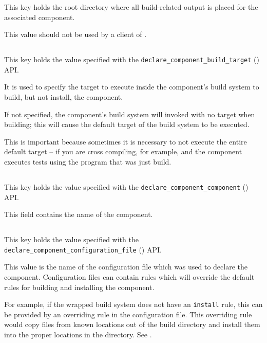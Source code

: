 This key holds the root directory where all build-related output is
placed for the associated component.

This value should not be used by a client of \lmsbw.

\subsection{}

This key holds the value specified with the
\texttt{declare\_component\_build\_target}
() API.

It is used to specify the target to execute inside the component's
build system to build, but not install, the component.

If not specified, the component's build system will invoked with no
target when building; this will cause the default target of the build
system to be executed.

This is important because sometimes it is necessary to not execute the
entire default target -- if you are cross compiling, for example, and
the component executes tests using the program that was just build.

\subsection{}

This key holds the value specified with the
\texttt{declare\_component\_component} () API.

This field contains the name of the component.

\subsection{}

This key holds the value specified with the
\texttt{declare\_component\_configuration\_file}
() API.

This value is the name of the configuration file which was used to
declare the component.  Configuration files can contain \makefile
rules which will override the default rules for building and
installing the component.

For example, if the wrapped build system does not have an
\texttt{install} rule, this can be provided by an overriding rule in
the configuration file.  This overriding rule would copy files from
known locations out of the build directory and install them into the
proper locations in the \destdir directory.  See
.

